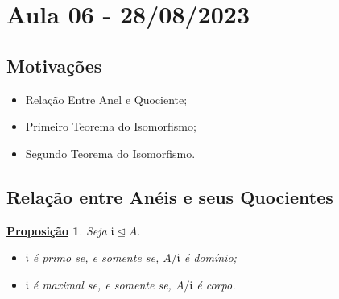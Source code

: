 \documentclass{article}
\newtheorem*{prop*}{\underline{Proposi\c c\~ao}}
\begin{document}
\section{Aula 06 - 28/08/2023}
\subsection{Motivações}
\begin{itemize}
  \item Relação Entre Anel e Quociente;
  \item Primeiro Teorema do Isomorfismo;
  \item Segundo Teorema do Isomorfismo.
\end{itemize}
\subsection{Relação entre Anéis e seus Quocientes}
\begin{prop*}
  Seja \(\mathfrak{i}\trianglelefteq{A}.\)
  \begin{itemize}
    \item[1)] \(\mathfrak{i}\) é primo se, e somente se, \(A/\mathfrak{i}\) é domínio;
    \item[2)] \(\mathfrak{i}\) é maximal se, e somente se, \(A/\mathfrak{i}\) é corpo.
  \end{itemize}
\end{prop*}
\end{document}

